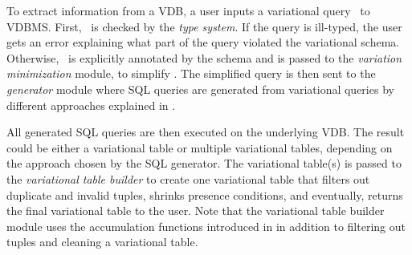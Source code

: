 To extract information from a VDB, 
a user inputs a variational query \vQ\ to VDBMS.
%
First, \vQ\ is checked by the \emph{type system}.
If the query is ill-typed, the user gets an error explaining what part of the 
query violated the variational schema.
Otherwise, 
\vQ\ is explicitly annotated by the schema and
%
is passed to the \emph{variation minimization} module,
to simplify \vQ.
%
The simplified query is then sent to the \emph{generator} module where
SQL queries are generated from variational queries by different approaches explained 
in .

All generated SQL queries are then executed on the underlying VDB.
 The result could be either 
a variational table or multiple variational tables, depending on the approach chosen by
the SQL generator. The variational table(s) is passed
to the \emph{variational table builder}
to create one variational table that filters out 
duplicate and invalid tuples, shrinks presence conditions, and 
eventually, returns the final variational table to the user.
Note that the variational table builder module uses the accumulation
functions introduced in  in addition to filtering out tuples and 
cleaning a variational table. 

